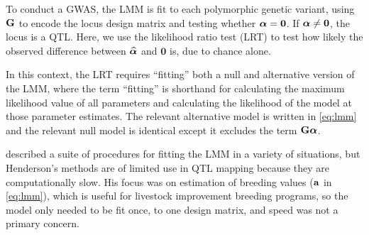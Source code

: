 To conduct a GWAS, the LMM is fit to each polymorphic genetic variant, using $\mathbf{G}$ to encode the locus design matrix and testing whether $\boldsymbol{\alpha} = \bm{0}$.
If $\boldsymbol{\alpha} \neq \bm{0}$, the locus is a QTL.
Here, we use the likelihood ratio test (LRT) to test how likely the observed difference between $\widehat{\boldsymbol{\alpha}}$ and $\bm{0}$ is, due to chance alone.

In this context, the LRT requires ``fitting'' both a null and alternative version of the LMM, where the term ``fitting'' is shorthand for calculating the maximum likelihood value of all parameters and calculating the likelihood of the model at those parameter estimates.
The relevant alternative model is written in \cref{eq:lmm} and the relevant null model is identical except it excludes the term $\mathbf{G}\boldsymbol{\alpha}$.

\citet{Henderson1984} described a suite of procedures for fitting the LMM in a variety of situations, but Henderson's methods are of limited use in QTL mapping because they are computationally slow.
His focus was on estimation of breeding values ($\mathbf{a}$ in \cref{eq:lmm}), which is useful for livestock improvement breeding programs, so the model only needed to be fit once, to one design matrix, and speed was not a primary concern.










